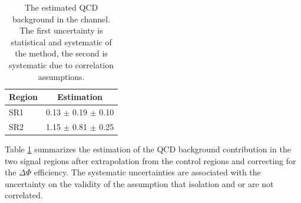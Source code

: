 

\begin{table}[!Hhtb]
\begin{center}
\begin{tabular}{|l|c|}
\hline\hline
 Region      &  Estimation\\
\hline\hline
SR1      & 0.13 $\pm$ 0.19 $\pm$ 0.10 \\
\hline
SR2      & 1.15 $\pm$ 0.81 $\pm$ 0.25  \\
\hline\hline
\end{tabular}
\caption{The estimated QCD background in the \tauTau channel. The first uncertainty is statistical and systematic of the method, the second is systematic due to correlation assumptions.}
\label{4QCDbg}
\end{center}
\end{table}

Table \ref{4QCDbg} 
summarizes the estimation of the QCD background contribution in the two signal regions after extrapolation from the control regions and 
correcting for the $\Delta \Phi$ efficiency.  
The systematic uncertainties are associated with the uncertainty on the validity 
of the assumption that isolation and \mttwo or \SumMT are not correlated.


